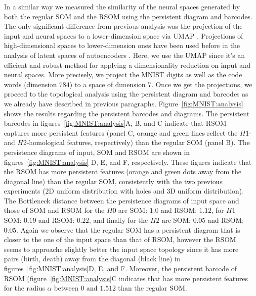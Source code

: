 In a similar way we measured the similarity of the neural spaces generated by both the regular SOM and the RSOM using the persistent diagram and barcodes. The only significant difference from previous analysis was the projection of the input and neural spaces to a lower-dimension space via UMAP \citep{Mcinnes:2018}. Projections of high-dimensional spaces to lower-dimension ones have been used before in the analysis of latent spaces of autoencoders \citep{Detorakis:2019}. Here, we use the UMAP since it's an efficient and robust method for applying a dimensionality reduction on input and neural spaces. More precisely, we project the MNIST digits as well as the code words (dimension $784$) to a space of dimension $7$. Once we get the projections, we proceed to the topological analysis using the persistent diagram and barcodes as we already have described in previous paragraphs.
Figure~\ref{fig:MNIST:analysis} shows the results regarding the persistent barcodes and diagrams. 
The persistent barcodes in figures~\ref{fig:MNIST:analysis}A, B, and C indicate that RSOM captures more 
persistent features (panel C, orange and green lines reflect the $H1$- and $H2$-homological features, respectively)
than the regular SOM (panel B). The persistence diagrams of input, SOM and RSOM are shown in 
figures~\ref{fig:MNIST:analysis} D, E, and F, respectively. 
These figures indicate that the RSOM has more persistent features (orange and green dots away from the diagonal
line) than the regular SOM, consistently with the two previous experiments ($2$D uniform distribution with holes
and $3$D uniform distribution). The Bottleneck distance between the persistence diagrams of input space and 
those of SOM and RSOM for the $H0$ are SOM: $1.0$ and RSOM: $1.12$, for $H1$ SOM: $0.19$ and RSOM: $0.22$, and
finally for the $H2$ are SOM: $0.05$ and RSOM:$0.05$. Again we observe that the regular SOM has a persistent 
diagram that is closer to the one of the input space than that of RSOM, however the RSOM seems to approache 
slightly better the input space topology since it has more pairs (birth, death) away from the diagonal (black
line) in figures~\ref{fig:MNIST:analysis}D, E, and F. Moreover, the persistent barcode of RSOM (figure~\ref{fig:MNIST:analysis}C indicates that has more persistent features for the radius $\alpha$
between $0$ and $1.512$ than the regular SOM.

